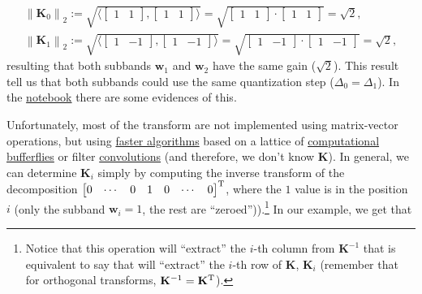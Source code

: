 \begin{equation}
  \begin{array}{l}
    \left\| {\mathbf K}_0 \right\|_2 := \sqrt{\langle \begin{bmatrix}1 & 1\end{bmatrix}, \begin{bmatrix}1 & 1\end{bmatrix} \rangle} = \sqrt{\begin{bmatrix}1 & 1\end{bmatrix} \cdot \begin{bmatrix}1 & 1\end{bmatrix}} = \sqrt{2},\\
    \left\| {\mathbf K}_1 \right\|_2 := \sqrt{\langle \begin{bmatrix}1 & -1\end{bmatrix}, \begin{bmatrix}1 & -1\end{bmatrix} \rangle} = \sqrt{\begin{bmatrix}1 & -1\end{bmatrix}\cdot \begin{bmatrix}1 & -1\end{bmatrix}} = \sqrt{2},
  \end{array}
\end{equation}
resulting that both subbands ${\mathbf w}_1$ and ${\mathbf w}_2$ have
the same gain ($\sqrt{2}$). This result tell us that both subbands
could use the same quantization step ($\Delta_0=\Delta_1$). In the
\href{https://github.com/Tecnologias-multimedia/Tecnologias-multimedia.github.io/blob/master/study_guide/11-stereo_coding/stereo_transforms_RD.ipynb}{notebook}
there are some evidences of this.

Unfortunately, most of the transform are not implemented using
matrix-vector operations, but using
\href{https://en.wikipedia.org/wiki/Fast_Fourier_transform}{faster
  algorithms} based on a lattice of
\href{https://en.wikipedia.org/wiki/Butterfly_diagram}{computational
  bufferflies} or filter
\href{https://en.wikipedia.org/wiki/Filter_(signal_processing)}{convolutions}
(and therefore, we don't know ${\mathbf K}$). In general, we can
determine ${\mathbf K}_i$ simply by computing the inverse transform of
the decomposition
$\begin{bmatrix} 0 & \cdots & 0 & 1 & 0 & \cdots &
  0 \end{bmatrix}^{\text T}$, where the $1$ value is in the position
$i$ (only the subband ${\mathbf w}_i=1$, the rest are
``zeroed'')).\footnote{Notice that this operation will ``extract'' the
  $i$-th column from ${\mathbf K}^{-1}$ that is equivalent to say that
  will ``extract'' the $i$-th row of ${\mathbf K}$, ${\mathbf K}_i$
  (remember that for orthogonal transforms,
  ${\mathbf K}^{-1}={\mathbf K}^{\text T}$).} In our example, we get
that

